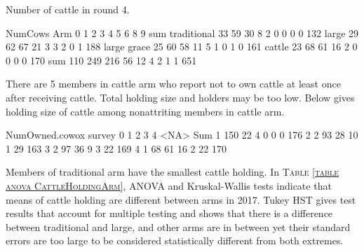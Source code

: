 Number of cattle in round 4.
\begin{Schunk}
\begin{Soutput}
             NumCows
Arm             0   1   2   3   4   5   6   8   9 sum
  traditional  33  59  30   8   2   0   0   0   0 132
  large        29  62  67  21   3   3   2   0   1 188
  large grace  25  60  58  11   5   1   0   1   0 161
  cattle       23  68  61  16   2   0   0   0   0 170
  sum         110 249 216  56  12   4   2   1   1 651
\end{Soutput}
\end{Schunk}
There are 5 members in \textsf{cattle} arm who report not to own cattle at least once after receiving cattle. Total holding size and holders may be too low. Below gives holding size of cattle among nonattriting members in \textsf{cattle} arm.
\begin{Schunk}
\begin{Soutput}
      NumOwned.cowox
survey   0   1   2   3   4 <NA> Sum
     1 150  22   4   0   0    0 176
     2   2  93  28  10   1   29 163
     3   2  97  36   9   3   22 169
     4   1  68  61  16   2   22 170
\end{Soutput}
\end{Schunk}
Members of \textsf{traditional} arm have the smallest cattle holding. In \textsc{\small Table \ref{table anova CattleHoldingArm}}, ANOVA and Kruskal-Wallis tests indicate that means of cattle holding are different between arms in 2017. Tukey HST gives test results that account for multiple testing and shows that there is a difference between \textsf{traditional} and \textsf{large}, and other arms are in between yet their standard errors are too large to be considered statistically different from both extremes.

